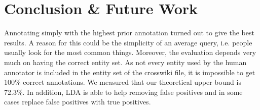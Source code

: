 \documentclass[a4paper,10pt,twocolumn]{article}
\begin{document}
\section{Conclusion \& Future Work}
Annotating simply with the highest prior annotation turned out to give the best results. A reason for this could be the simplicity of an average query, i.e. people usually look for the most common things. Moreover, the evaluation depends very much on having the correct entity set. As not every entity used by the human annotator is included in the entity set of the crosswiki file, it is impossible to get 100\% correct annotations. We measured that our theoretical upper bound is 72.3\%. In addition, LDA is able to help removing false positives and in some cases replace false positives with true positives.



\end{document}
